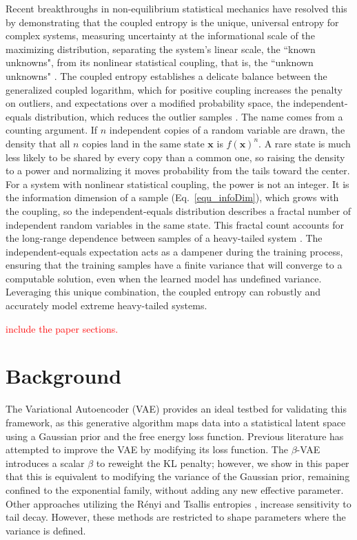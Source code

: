 \documentclass[twoside,11pt]{article}
\begin{document}
Recent breakthroughs in non-equilibrium statistical mechanics have resolved this by demonstrating that the coupled entropy is the unique, universal entropy for complex systems, measuring uncertainty at the informational scale of the maximizing distribution, separating the system's linear scale, the ``known unknowns", from its nonlinear statistical coupling, that is, the ``unknown unknowns" \citep{nelsonUniqueUniversalEntropy2026}. The coupled entropy establishes a delicate balance between the generalized coupled logarithm, which for positive coupling increases the penalty on outliers, and expectations over a modified probability space, the independent-equals distribution, which reduces the outlier samples \citep{al-najafiIndependentApproximatesProvide2026}. The name comes from a counting argument. If $n$ independent copies of a random variable are drawn, the density that all $n$ copies land in the same state $\mathbf{x}$ is $f(\mathbf{x})^n$. A rare state is much less likely to be shared by every copy than a common one, so raising the density to a power and normalizing it moves probability from the tails toward the center. For a system with nonlinear statistical coupling, the power is not an integer. It is the information dimension of a sample (Eq.~\ref{equ_infoDim}), which grows with the coupling, so the independent-equals distribution describes a fractal number of independent random variables in the same state. This fractal count accounts for the long-range dependence between samples of a heavy-tailed system \citep{nelsonUniqueUniversalEntropy2026}. The independent-equals expectation acts as a dampener during the training process, ensuring that the training samples have a finite variance that will converge to a computable solution, even when the learned model has undefined variance. Leveraging this unique combination, the coupled entropy can robustly and accurately model extreme heavy-tailed systems.

\textcolor{red}{include the paper sections.}

\section{Background}

The Variational Autoencoder (VAE) \citep{kingmaIntroductionVariationalAutoencoders2019} provides an ideal testbed for validating this framework, as this generative algorithm maps data into a statistical latent space using a Gaussian prior and the free energy loss function. Previous literature has attempted to improve the VAE by modifying its loss function. The $\beta$-VAE \citep{higginsBetavaeLearningBasic2017} introduces a scalar $\beta$ to reweight the KL penalty; however, we show in this paper that this is equivalent to modifying the variance of the Gaussian prior, remaining confined to the exponential family, without adding any new effective parameter. Other approaches utilizing the Rényi and Tsallis entropies \citep{kobayashisQVAEDisentangledRepresentation2020, kobayashiSparseRepresentationLearning2023,liRenyiDivergenceVariational2016, futamiVariationalInferenceBased2018, akramiRobustVariationalAutoencoder2019}, increase sensitivity to tail decay. However, these methods are restricted to shape parameters where the variance is defined.
\end{document}
